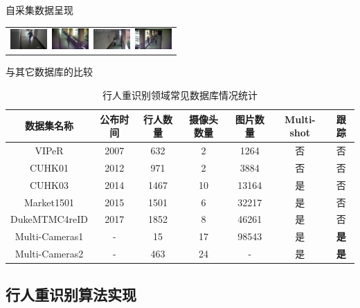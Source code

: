\begin{frame}{自采集数据呈现}
\begin{table}
\begin{tabular}{c}
            \includegraphics[width=14mm]{figures/3-4}~\includegraphics[width=14mm]{figures/3-5}~\includegraphics[width=14mm]{figures/3-6}~\includegraphics[width=14mm]{figures/3-7} \\
        \end{tabular}
    \end{table}
\end{frame}

\begin{frame}{与其它数据库的比较}
    \begin{table}
    \scriptsize
    \centering
    \caption{行人重识别领域常见数据库情况统计}
    \label{tab:reiddataset}
    \begin{tabularx}{\textwidth}{ccccccc}
    \toprule
    数据集名称   & 公布时间 & 行人数量 & 摄像头数量 & 图片数量  & Multi-shot & 跟踪 \\ \midrule
    VIPeR  & 2007 & 632  & 2     & 1264  & 否  & 否 \\[0.5em]
    CUHK01 & 2012 & 971  & 2     & 3884  & 否  & 否 \\[0.5em]
    CUHK03 & 2014 & 1467 & 10    & 13164 & 是  & 否 \\[0.5em]
    Market1501 & 2015 & 1501 & 6     & 32217 & 是  & 否 \\[0.5em]
    DukeMTMC4reID  & 2017 & 1852 & 8     & 46261 & 是  & 否 \\[0.5em]
    Multi-Cameras1 &  -   & 15   & 17     & 98543 & 是  & \textbf{是} \\[0.5em]
    Multi-Cameras2 &  -   & 463 & 24     & - & 是  & \textbf{是} \\
    \bottomrule
    \end{tabularx}
    \end{table}
\end{frame}

\subsection{行人重识别算法实现}

